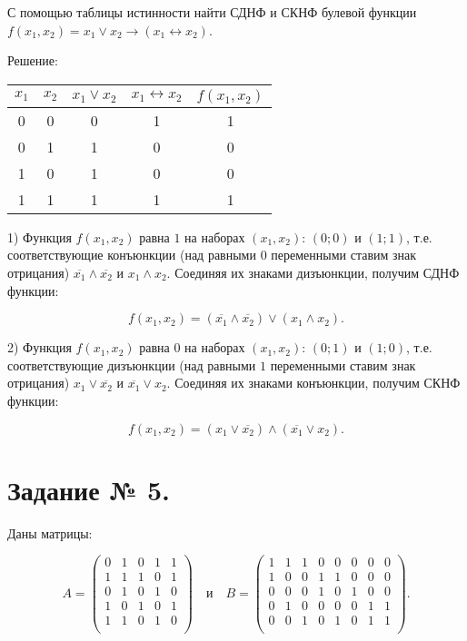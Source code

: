\documentclass[fleqn]{article}
\begin{document}
С помощью таблицы истинности найти СДНФ и СКНФ булевой
функции $f(x_1,x_2)=x_1 \vee x_2 \to(x_1 \leftrightarrow x_2)$.

\begin{center}Решение:\end{center}

\medskip
\begin{tabular}{|c|c|c|c|c|}
\hline
$x_1$ & $x_2$ & $x_1 \vee x_2$ & $x_1 \leftrightarrow x_2$ & $f(x_1,x_2)$ \\
\hline
0 & 0 & 0 & 1 & 1 \\
\hline
0 & 1 & 1 & 0 & 0 \\
\hline
1 & 0 & 1 & 0 & 0 \\
\hline
1 & 1 & 1 & 1 & 1 \\
\hline
\end{tabular}
\medskip

1) Функция $f(x_1, x_2)$ равна $1$ на наборах $(x_1, x_2)$: $(0;0)$ и $(1;1)$, т.е. соответствующие конъюнкции (над равными $0$ переменными ставим знак отрицания) $\overline{x_1} \wedge \overline{x_2}$ и $x_1 \wedge x_2$. Соединяя их знаками дизъюнкции, получим СДНФ функции:

$$f(x_1, x_2)=(\overline{x_1}\wedge\overline{x_2})\vee(x_1\wedge x_2).$$

2) Функция $f(x_1, x_2)$ равна $0$ на наборах $(x_1, x_2)$: $(0;1)$ и $(1;0)$, т.е. соответствующие дизъюнкции (над равными $1$ переменными ставим знак отрицания) $x_1 \vee \overline{x_2}$ и $\overline{x_1} \vee x_2$. Соединяя их знаками конъюнкции, получим СКНФ функции:

$$f(x_1, x_2)=(x_1\vee\overline{x_2})\wedge(\overline{x_1}\vee x_2).$$

\section*{Задание № 5.}

Даны матрицы:

$$A=
\begin{pmatrix}
0 & 1 & 0 & 1 & 1 \\
1 & 1 & 1 & 0 & 1 \\
0 & 1 & 0 & 1 & 0 \\
1 & 0 & 1 & 0 & 1 \\
1 & 1 & 0 & 1 & 0 \\
\end{pmatrix}
\quad
\textit{и}
\quad
B=
\begin{pmatrix}
1 & 1 & 1 & 0 & 0 & 0 & 0 & 0 \\
1 & 0 & 0 & 1 & 1 & 0 & 0 & 0 \\
0 & 0 & 0 & 1 & 0 & 1 & 0 & 0 \\
0 & 1 & 0 & 0 & 0 & 0 & 1 & 1 \\
0 & 0 & 1 & 0 & 1 & 0 & 1 & 1 \\
\end{pmatrix}.
$$
\end{document}
